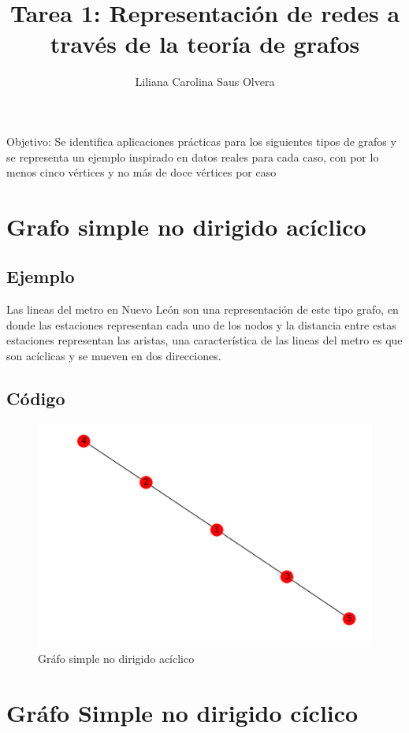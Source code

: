 \documentclass[10pt,a4paper]{article}
\author{Liliana Carolina Saus Olvera }
\title{Tarea 1: Representación de redes a través de la teoría de grafos}
\begin{document}
\maketitle
Objetivo: Se identifica aplicaciones prácticas para los siguientes tipos de grafos y se representa un ejemplo inspirado en datos reales para cada caso, con por lo menos cinco vértices y no más de doce vértices por caso

\section{Grafo simple no dirigido acíclico}
\subsection{Ejemplo} Las lineas del metro en Nuevo León son una representación de este tipo grafo, en donde las estaciones representan cada uno de los nodos y la distancia entre estas estaciones representan las aristas, una característica de las lineas del metro es que son acíclicas y se mueven en dos direcciones.

\subsection{Código}
\begin{figure}[H]
\centering
\includegraphics[scale=.5]{grafosimplenodirigidoaciclico}
\caption{Gráfo simple no dirigido acíclico}
\end{figure}

\section{Gráfo Simple no dirigido cíclico}
\end{document}
